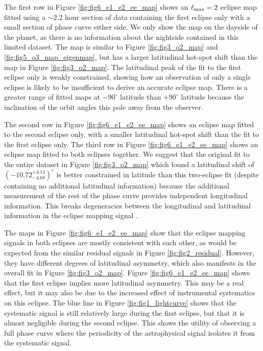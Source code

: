 \documentclass[twocolumn]{aastex631}
\begin{document}
The first row in Figure \ref{fig:fig6_e1_e2_ee_map} shows an $\ell_{\rm max}=2$ eclipse map fitted using a $\sim2.2$ hour section of data containing the first eclipse only with a small section of phase curve either side. We only show the map on the dayside of the planet, as there is no information about the nightside contained in this limited dataset. The map is similar to Figure \ref{fig:fig3_o2_map} and \ref{fig:fig5_o3_map_eigenmap}, but has a larger latitudinal hot-spot shift than the map in Figure \ref{fig:fig3_o2_map}. The latitudinal peak of the fit to the first eclipse only is weakly constrained, showing how an observation of only a single eclipse is likely to be insufficient to derive an accurate eclipse map.  There is a greater range of fitted maps at $-90^{\circ}$ latitude than $+90^{\circ}$ latitude because the inclination of the orbit angles this pole away from the observer.

The second row in Figure \ref{fig:fig6_e1_e2_ee_map} shows an eclipse map fitted to the second eclipse only, with a smaller latitudinal hot-spot shift than the fit to the first eclipse only. The third row in Figure \ref{fig:fig6_e1_e2_ee_map} shows an eclipse map fitted to both eclipses together. We suggest that the original fit to the entire dataset in Figure \ref{fig:fig3_o2_map} which found a latitudinal shift of $( -10.72 ^{+ 4.14 } _{- 4.68 })^{\circ}$ is better constrained in latitude than this two-eclipse fit (despite containing no additional latitudinal information) because the additional measurement of the rest of the phase curve provides independent longitudinal information. This breaks degeneracies between the longitudinal and latitudinal information in the eclipse mapping signal \citep{boone2023analytic}. 

The maps in Figure \ref{fig:fig6_e1_e2_ee_map} show that the eclipse mapping signals in both eclipses are mostly consistent with each other, as would be expected from the similar residual signals in Figure \ref{fig:fig2_residual}. However, they have different degrees of latitudinal asymmetry, which also manifests in the overall fit in Figure \ref{fig:fig3_o2_map}. Figure \ref{fig:fig6_e1_e2_ee_map} shows that the first eclipse implies more latitudinal asymmetry. This may be a real effect, but it may also be due to the increased effect of instrumental systematics on this eclipse. The blue line in Figure \ref{fig:fig1_lightcurve} shows that the systematic signal is still relatively large during the first eclipse, but that it is almost negligible during the second eclipse. This shows the utility of observing a full phase curve where the periodicity of the astrophysical signal isolates it from the systematic signal. 
\end{document}
